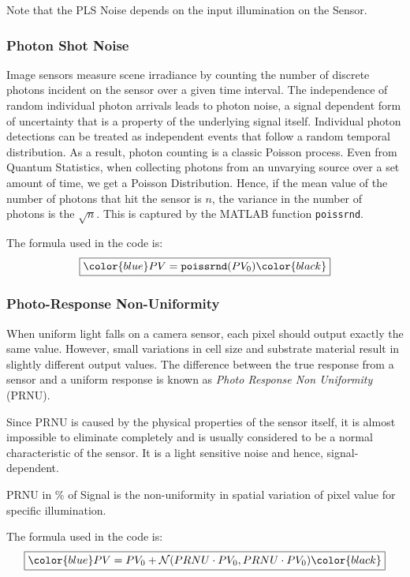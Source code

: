 Note that the PLS Noise depends on the input illumination on the Sensor.


\subsubsection{Photon Shot Noise} %
Image sensors measure scene irradiance by counting the number of discrete photons incident on the sensor over a given time interval. The independence of random individual photon arrivals leads to photon noise, a signal dependent form of uncertainty that is a property of the underlying signal itself. Individual photon detections can be treated as independent events that follow a random temporal distribution. As a result, photon counting is a classic Poisson process. Even from Quantum Statistics, when collecting photons from an unvarying source over a set amount of time, we get a Poisson Distribution. Hence, if the mean value of the number of photons that hit the sensor is $n$, the variance in the number of photons is the $\sqrt{n}$. This is captured by the MATLAB function \texttt{poissrnd}.

The formula used in the code is:
\begin{equation}
    \boxed{ \color{blue} PV = \texttt{poissrnd}(PV_0) \color{black}}
\end{equation}


\subsubsection{Photo-Response Non-Uniformity} %
When uniform light falls on a camera sensor, each pixel should output exactly the same value. However, small variations in cell size and substrate material result in slightly different output values. The difference between the true response from a sensor and a uniform response is known as \emph{Photo Response Non Uniformity} (PRNU).

Since PRNU is caused by the physical properties of the sensor itself, it is almost impossible to eliminate completely and is usually considered to be a normal characteristic of the sensor. It is a light sensitive noise and hence, signal-dependent.

PRNU in \% of Signal is the non-uniformity in spatial variation of pixel value for specific illumination.

The formula used in the code is:
\begin{equation}
    \boxed{ \color{blue} PV = PV_0 + \mathcal{N}(PRNU \cdot PV_0, PRNU \cdot PV_0)   \color{black}}
\end{equation}

